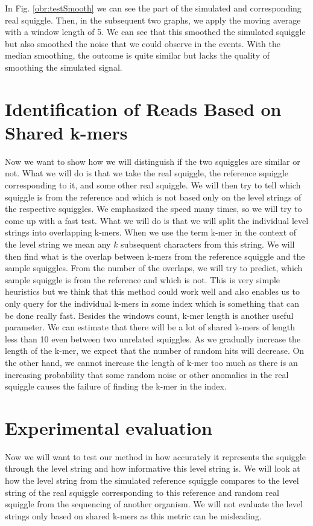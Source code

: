 In Fig. \ref{obr:testSmooth} we can see the part of the simulated and corresponding real squiggle.
Then, in the subsequent two graphs, we apply the moving average with a window length
of 5. We can see that this smoothed the simulated squiggle but also smoothed the noise
that we could observe in the events. With the median smoothing, the outcome is quite
similar but lacks the quality of smoothing the simulated signal.

\section{Identification of Reads Based on Shared k-mers}

Now we want to show how we will distinguish if the two squiggles are similar or not.
What we will do is that we take the real squiggle, the reference squiggle corresponding to it, and
some other real squiggle. We will then try to tell which squiggle is from the reference
and which is not based only on the level strings of the respective squiggles. We
emphasized the speed many times, so we will try to come up with a fast test.
What we will do is that we will split the individual level strings into overlapping k-mers.
When we use the term k-mer in the context of the level string we mean any $k$ subsequent
characters from this string. We will then find what is the overlap
between k-mers from the reference squiggle and the sample squiggles. From the number of the overlaps, we will try
to predict, which sample squiggle is from the reference and which is not. This is very
simple heuristics but we think that this method could work well and also enables us
to only query for the individual k-mers in some index which is something that can be done really fast.
Besides the windows count, k-mer length is another useful parameter. We can estimate
that there will be a lot of shared k-mers of length less than 10 even between two unrelated
squiggles. As we gradually increase the length of the k-mer, we expect that the number
of random hits will decrease. On the other hand, we cannot increase the length of k-mer
too much as there is an increasing probability that some random noise or other anomalies
in the real squiggle causes the failure of finding the k-mer in the index.

\section{Experimental evaluation}

Now we will want to test our method in how accurately it represents the squiggle
through the level string and how informative this level string is. We will
look at how the level string from the simulated reference squiggle compares to the
level string of the real squiggle corresponding to this reference and random real squiggle
from the sequencing of another organism. We will not evaluate the level strings
only based on shared k-mers as this metric can be misleading.

